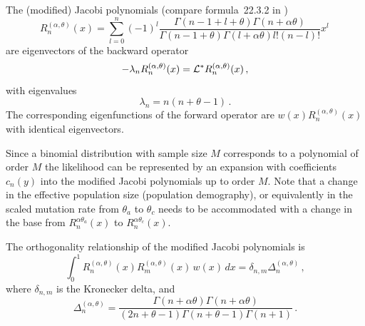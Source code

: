 \documentclass[preprint]{elsarticle}
\newcommand\given{{\,|\,}}
\newcommand\y{\ensuremath{y}}
\begin{document}

The (modified) Jacobi polynomials (compare formula~22.3.2 in \citet{Abra70})
\begin{equation}
  R_n^{(\alpha,\theta)}(x)=\sum_{l=0}^n(-1)^l\frac{\Gamma(n-1+l+\theta)\Gamma(n+\alpha\theta)}{\Gamma(n-1+\theta)\Gamma(l+\alpha\theta)l!(n-l)!}x^l\,
\end{equation}
are eigenvectors of the backward operator
\begin{equation}
    -\lambda_n R_n^{(\alpha,\theta)}(x)={\cal L}^{*}R_n^{(\alpha,\theta)}(x)\,,
\end{equation}
with eigenvalues 
\begin{equation}
    \lambda_n=n(n+\theta-1)\,.
\end{equation}
The corresponding eigenfunctions of the forward operator are $w(x)R_n^{(\alpha,\theta)}(x)$ with identical eigenvectors.   

Since a binomial distribution with sample size $M$ corresponds to a polynomial of order $M$ the likelihood can be represented by an expansion with coefficients $c_n(\y)$ into the modified Jacobi polynomials up to order $M$. Note that a change in the effective population size (population demography), or equivalently in the scaled mutation rate from $\theta_a$ to $\theta_c$ needs to be accommodated with a change in the base from  $R_n^{\alpha\theta_a}(x)$ to $R_n^{\alpha\theta_c}(x)$. 

The orthogonality relationship of the modified Jacobi polynomials is
\begin{equation}\label{eq:ortho_Jacobi}
    \int_0^1 R_n^{(\alpha,\theta)}(x) R_m^{(\alpha,\theta)}(x)\, w(x)\,dx=\delta_{n,m} \Delta_n^{(\alpha,\theta)}\,,
\end{equation}
where $\delta_{n,m}$ is the Kronecker delta, and 
\begin{equation}
    \Delta_n^{(\alpha,\theta)}=\frac{\Gamma(n+\alpha\theta)\Gamma(n+\alpha\theta)}{(2n+\theta-1)\Gamma(n+\theta-1)\Gamma(n+1)}\,.
\end{equation}
\end{document}

